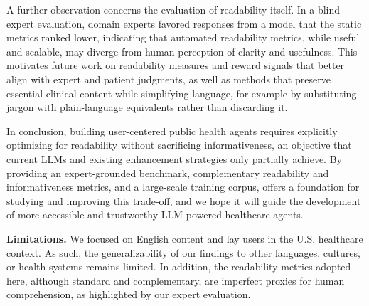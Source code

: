A further observation concerns the evaluation of readability itself.
In a blind expert evaluation, domain experts favored responses from a model that the static metrics ranked lower, indicating that automated readability metrics, while useful and scalable, may diverge from human perception of clarity and usefulness.
This motivates future work on readability measures and reward signals that better align with expert and patient judgments, as well as methods that preserve essential clinical content while simplifying language, for example by substituting jargon with plain-language equivalents rather than discarding it.

In conclusion, building user-centered public health agents requires explicitly optimizing for readability without sacrificing informativeness, an objective that current LLMs and existing enhancement strategies only partially achieve.
By providing an expert-grounded benchmark, complementary readability and informativeness metrics, and a large-scale training corpus, \repqa offers a foundation for studying and improving this trade-off, and we hope it will guide the development of more accessible and trustworthy LLM-powered healthcare agents.

\textbf{Limitations.}
We focused on English content and lay users in the U.S. healthcare context. As such, the generalizability of our findings to other languages, cultures, or health systems remains limited. In addition, the readability metrics adopted here, although standard and complementary, are imperfect proxies for human comprehension, as highlighted by our expert evaluation.
